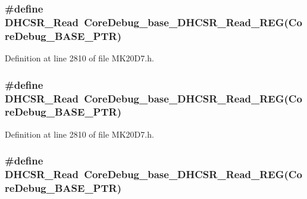 \subsubsection[{\texorpdfstring{D\+H\+C\+S\+R\+\_\+\+Read}{DHCSR_Read}}]{\setlength{\rightskip}{0pt plus 5cm}\#define D\+H\+C\+S\+R\+\_\+\+Read~{\bf Core\+Debug\+\_\+base\+\_\+\+D\+H\+C\+S\+R\+\_\+\+Read\+\_\+\+R\+EG}({\bf Core\+Debug\+\_\+\+B\+A\+S\+E\+\_\+\+P\+TR})}\hypertarget{group___core_debug___register___accessor___macros_ga7d77eafe76b2000c7159e58e11ade9a1}{}\label{group___core_debug___register___accessor___macros_ga7d77eafe76b2000c7159e58e11ade9a1}


Definition at line 2810 of file M\+K20\+D7.\+h.

\subsubsection[{\texorpdfstring{D\+H\+C\+S\+R\+\_\+\+Read}{DHCSR_Read}}]{\setlength{\rightskip}{0pt plus 5cm}\#define D\+H\+C\+S\+R\+\_\+\+Read~{\bf Core\+Debug\+\_\+base\+\_\+\+D\+H\+C\+S\+R\+\_\+\+Read\+\_\+\+R\+EG}({\bf Core\+Debug\+\_\+\+B\+A\+S\+E\+\_\+\+P\+TR})}\hypertarget{group___core_debug___register___accessor___macros_ga7d77eafe76b2000c7159e58e11ade9a1}{}\label{group___core_debug___register___accessor___macros_ga7d77eafe76b2000c7159e58e11ade9a1}


Definition at line 2810 of file M\+K20\+D7.\+h.

\subsubsection[{\texorpdfstring{D\+H\+C\+S\+R\+\_\+\+Read}{DHCSR_Read}}]{\setlength{\rightskip}{0pt plus 5cm}\#define D\+H\+C\+S\+R\+\_\+\+Read~{\bf Core\+Debug\+\_\+base\+\_\+\+D\+H\+C\+S\+R\+\_\+\+Read\+\_\+\+R\+EG}({\bf Core\+Debug\+\_\+\+B\+A\+S\+E\+\_\+\+P\+TR})}\hypertarget{group___core_debug___register___accessor___macros_ga7d77eafe76b2000c7159e58e11ade9a1}{}\label{group___core_debug___register___accessor___macros_ga7d77eafe76b2000c7159e58e11ade9a1}


